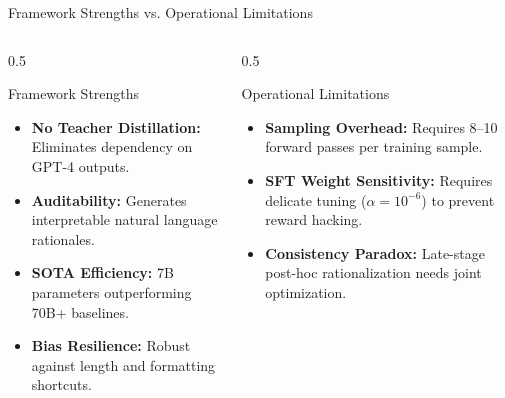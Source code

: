 \documentclass[10pt]{beamer}
\begin{document}
\begin{frame}{Framework Strengths vs. Operational Limitations}
\begin{columns}[T]
    \begin{column}{0.5\textwidth}
        \begin{block}{Framework Strengths}
            \begin{itemize}
                \item \textbf{No Teacher Distillation:} Eliminates dependency on GPT-4 outputs.
                \item \textbf{Auditability:} Generates interpretable natural language rationales.
                \item \textbf{SOTA Efficiency:} 7B parameters outperforming 70B+ baselines.
                \item \textbf{Bias Resilience:} Robust against length and formatting shortcuts.
            \end{itemize}
        \end{block}
    \end{column}
    
    \begin{column}{0.5\textwidth}
        \begin{block}{Operational Limitations}
            \begin{itemize}
                \item \textbf{Sampling Overhead:} Requires 8–10 forward passes per training sample.
                \item \textbf{SFT Weight Sensitivity:} Requires delicate tuning ($\alpha = 10^{-6}$) to prevent reward hacking.
                \item \textbf{Consistency Paradox:} Late-stage post-hoc rationalization needs joint optimization.
            \end{itemize}
        \end{block}
    \end{column}
\end{columns}
\end{frame}
\end{document}
